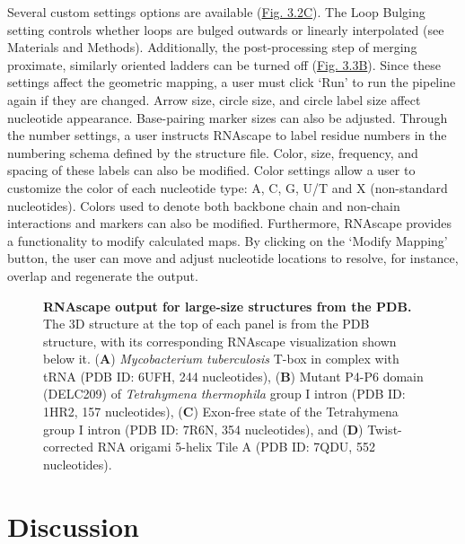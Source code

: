 Several custom settings options are available (\hyperref[fig:rnascape2]{Fig. 3.2C}). The Loop Bulging setting controls whether loops are bulged outwards or linearly interpolated (see Materials and Methods). Additionally, the post-processing step of merging proximate, similarly oriented ladders can be turned off (\hyperref[fig:rnascape3]{Fig. 3.3B}). Since these settings affect the geometric mapping, a user must click ‘Run’ to run the pipeline again if they are changed. Arrow size, circle size, and circle label size affect nucleotide appearance. Base-pairing marker sizes can also be adjusted. Through the number settings, a user instructs RNAscape to label residue numbers in the numbering schema defined by the structure file. Color, size, frequency, and spacing of these labels can also be modified. Color settings allow a user to customize the color of each nucleotide type: A, C, G, U/T and X (non-standard nucleotides). Colors used to denote both backbone chain and non-chain interactions and markers can also be modified. Furthermore, RNAscape provides a functionality to modify calculated maps. By clicking on the ‘Modify Mapping’ button, the user can move and adjust nucleotide locations to resolve, for instance, overlap and regenerate the output.
\begin{center}
    \begin{figure}
        \caption[RNAscape output for large-size structures from the PDB.]{\textbf{RNAscape output for large-size structures from the PDB.} The 3D structure at the top of each panel is from the PDB structure, with its corresponding RNAscape visualization shown below it. ({\bf A}) \textit{Mycobacterium tuberculosis} T-box in complex with tRNA (PDB ID: 6UFH, 244 nucleotides), ({\bf B}) Mutant P4-P6 domain (DELC209) of \textit{Tetrahymena thermophila} group I intron (PDB ID: 1HR2, 157 nucleotides), ({\bf C}) Exon-free state of the Tetrahymena group I intron (PDB ID: 7R6N, 354 nucleotides), and ({\bf D}) Twist-corrected RNA origami 5-helix Tile A (PDB ID: 7QDU, 552 nucleotides).}
  \label{fig:rnascape4}
\end{figure}
\end{center}

\section{Discussion}

